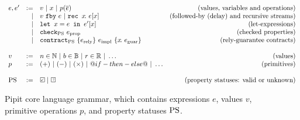 
\begin{figure}
  \[
  \begin{array}{lrlr}
    e, e' & := & v ~|~ x ~|~ p(\ov{e}) & \mbox{(values, variables and operations)} \\
          & | & \xfby{v}{e} ~|~ \xrec{x}{e[x]} & \mbox{(followed-by (delay) and recursive streams)} \\ %
          & | & \xlet{x}{e}{e'[x]} & \mbox{(let-expressions)}\\
          & | & \xcheckP{\PStatus}{e_{\text{prop}}} & \mbox{(checked properties)} \\
          & | & \xcontractP{\PStatus}{\erely}{\eimpl}{x\!.~\eguar} & \mbox{(rely-guarantee contracts)} \\
    \\
    v & := & n \in \mathbb{N} ~|~ b \in \mathbb{B} ~|~ r \in \mathbb{R} ~|~ \hdots  & \mbox{(values)} \\
    p & := & (+) ~|~ (-) ~|~ (\times) ~|~ @if-then-else@ ~|~ \hdots & \mbox{(primitives)} \\
    \\
    \PStatus & := & \PSValid ~|~ \PSUnknown & \mbox{(property statuses: valid or unknown)}\\
    \end{array}
  \]
  \caption{Pipit core language grammar, which contains expressions $e$, values $v$, primitive operations $p$, and property statuses $\text{PS}$.}
  \label{f:core-grammar}
\end{figure}